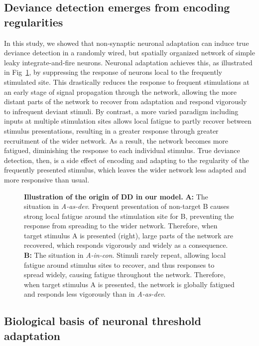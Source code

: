 \documentclass[10pt,letterpaper]{article}
\newcommand{\dev}{\textit{A-as-dev}}
\newcommand{\msc}{\textit{A-in-con}}
\newcommand{\FIG}[1]{Fig~\ref{fig:#1}}
\begin{document}
\subsection*{Deviance detection emerges from encoding regularities}

In this study, we showed that non-synaptic neuronal adaptation can induce true deviance detection in a randomly wired, but spatially organized network of simple leaky integrate-and-fire neurons. Neuronal adaptation achieves this, as illustrated in \FIG{11}, by suppressing the response of neurons local to the frequently stimulated site. This drastically reduces the response to frequent stimulations at an early stage of signal propagation through the network, allowing the more distant parts of the network to recover from adaptation and respond vigorously to infrequent deviant stimuli. By contrast, a more varied paradigm including inputs at multiple stimulation sites allows local fatigue to partly recover between stimulus presentations, resulting in a greater response through greater recruitment of the wider network. As a result, the network becomes more fatigued, diminishing the response to each individual stimulus. True deviance detection, then, is a side effect of encoding and adapting to the regularity of the frequently presented stimulus, which leaves the wider network less adapted and more responsive than usual.

\begin{figure}[!h]
    \caption{%
        \textbf{Illustration of the origin of DD in our model.}
        \textbf{A:} The situation in \dev{}. Frequent presentation of non-target B causes strong local fatigue around the stimulation site for B, preventing the response from spreading to the wider network. Therefore, when target stimulus A is presented (right), large parts of the network are recovered, which responds vigorously and widely as a consequence.
        \textbf{B:} The situation in \msc{}. Stimuli rarely repeat, allowing local fatigue around stimulus sites to recover, and thus responses to spread widely, causing fatigue throughout the network. Therefore, when target stimulus A is presented, the network is globally fatigued and responds less vigorously than in \dev{}.
    }
    \label{fig:11}
\end{figure}

\subsection*{Biological basis of neuronal threshold adaptation}
\end{document}
